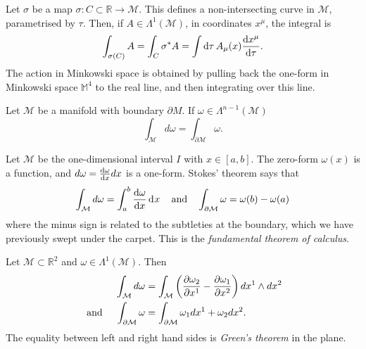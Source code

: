 \begin{example}[]
  Let $\sigma$ be a map $\sigma \colon C \subset \mathbb{R} \to \mathcal{M}$. This defines a non-intersecting curve in $\mathcal{M}$, parametrised by $\tau$. Then, if $A \in \Lambda^1(\mathcal{M})$, in coordinates $x^\mu$, the integral is
  \begin{equation}
    \int_{\sigma(C)} A = \int_{C}\sigma^* A = \int \dd{\tau} A_\mu (x) \dv{x^\mu}{\tau}.
  \end{equation}
  The action in Minkowski space is obtained by pulling back the one-form in Minkowski space $\mathbb{M}^4$ to the real line, and then integrating over this line.
\end{example}

\begin{theorem}
  Let $\mathcal{M}$ be a manifold with boundary $\partial M$.
  If $\omega \in \Lambda^{n-1}(\mathcal{M})$
  \begin{equation}
    \int_{\mathcal{M}} d\omega = \int_{\partial \mathcal{M}} \omega.
  \end{equation}
\end{theorem}

\begin{example}[]
  Let $\mathcal{M}$ be the one-dimensional interval $I$ with $x \in [a, b]$. The zero-form $\omega(x)$ is a function, and $d\omega = \dv{\omega}{x} dx$ is a one-form.
  Stokes' theorem says that
  \begin{equation}
    \int_{\mathcal{M}} d\omega = \int_{a}^{b} \dv{\omega}{x} \dd[]{x} \quad \text{and} \quad 
    \int_{\partial \mathcal{M}} \omega = \omega(b) - \omega(a)
  \end{equation}
  where the minus sign is related to the subtleties at the boundary, which we have previously swept under the carpet.
  This is the \emph{fundamental theorem of calculus}.
\end{example}

\begin{example}[]
  Let $\mathcal{M} \subset \mathbb{R}^2$ and $\omega \in \Lambda^1(\mathcal{M})$. Then
  \begin{align}
    \int_{\mathcal{M}} d\omega &= \int_{\mathcal{M}} \left( \pdv{\omega_2}{x^1} - \pdv{\omega_1}{x^2} \right) dx^1 \wedge dx^2 \\
    \text{ and } \quad \int_{\partial \mathcal{M}} \omega &= \int_{\partial \mathcal{M}} \omega_1 dx^1 + \omega_2 dx^2.
  \end{align}
  The equality between left and right hand sides is \emph{Green's theorem} in the plane.
\end{example}

